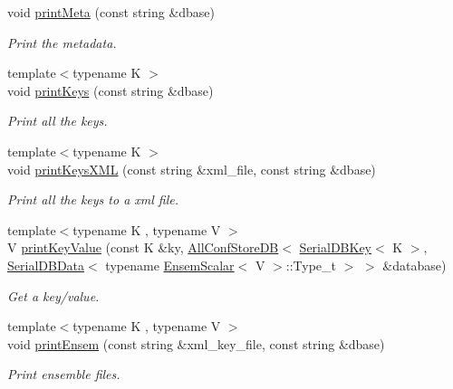 \begin{DoxyCompactItemize}
\item 
void \mbox{\hyperlink{adat-devel_2main_2dbutil_2dbutil_8cc_a0577d572da492642f9cf5f404d0116d9}{print\+Meta}} (const string \&dbase)
\begin{DoxyCompactList}\small\item\em Print the metadata. \end{DoxyCompactList}\item 
{\footnotesize template$<$typename K $>$ }\\void \mbox{\hyperlink{adat-devel_2main_2dbutil_2dbutil_8cc_a05c6483ffb9fa71112b451a5dd7eb935}{print\+Keys}} (const string \&dbase)
\begin{DoxyCompactList}\small\item\em Print all the keys. \end{DoxyCompactList}\item 
{\footnotesize template$<$typename K $>$ }\\void \mbox{\hyperlink{adat-devel_2main_2dbutil_2dbutil_8cc_a44428d59560cb466420c5c0ca60315e5}{print\+Keys\+X\+ML}} (const string \&xml\+\_\+file, const string \&dbase)
\begin{DoxyCompactList}\small\item\em Print all the keys to a xml file. \end{DoxyCompactList}\item 
{\footnotesize template$<$typename K , typename V $>$ }\\V \mbox{\hyperlink{adat-devel_2main_2dbutil_2dbutil_8cc_a1c5a310406bc62a92190de39689f1005}{print\+Key\+Value}} (const K \&ky, \mbox{\hyperlink{classFILEDB_1_1AllConfStoreDB}{All\+Conf\+Store\+DB}}$<$ \mbox{\hyperlink{classADATIO_1_1SerialDBKey}{Serial\+D\+B\+Key}}$<$ K $>$, \mbox{\hyperlink{classADATIO_1_1SerialDBData}{Serial\+D\+B\+Data}}$<$ typename \mbox{\hyperlink{structENSEM_1_1EnsemScalar}{Ensem\+Scalar}}$<$ V $>$\+::Type\+\_\+t $>$ $>$ \&database)
\begin{DoxyCompactList}\small\item\em Get a key/value. \end{DoxyCompactList}\item 
{\footnotesize template$<$typename K , typename V $>$ }\\void \mbox{\hyperlink{adat-devel_2main_2dbutil_2dbutil_8cc_ad3cbb159b8b76eaab3410b4bce843558}{print\+Ensem}} (const string \&xml\+\_\+key\+\_\+file, const string \&dbase)
\begin{DoxyCompactList}\small\item\em Print ensemble files. \end{DoxyCompactList}\item 

\end{DoxyCompactItemize}
